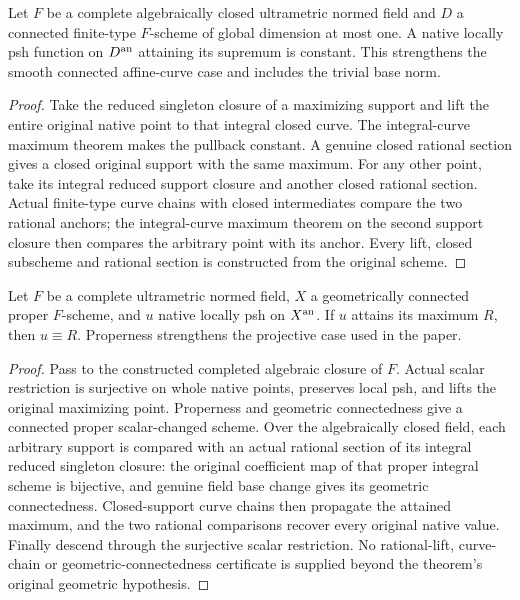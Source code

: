\begin{theorem}\label{thm:fc-curve-mp}
\leanok
{}
Let $F$ be a complete algebraically closed ultrametric normed field and $D$ a connected finite-type $F$-scheme of global dimension at most one. A native locally psh function on $D^{\mathrm{an}}$ attaining its supremum is constant. This strengthens the smooth connected affine-curve case and includes the trivial base norm.
\end{theorem}

\begin{proof}
Take the reduced singleton closure of a maximizing support and lift the entire original native point to that integral closed curve. The integral-curve maximum theorem makes the pullback constant. A genuine closed rational section gives a closed original support with the same maximum. For any other point, take its integral reduced support closure and another closed rational section. Actual finite-type curve chains with closed intermediates compare the two rational anchors; the integral-curve maximum theorem on the second support closure then compares the arbitrary point with its anchor. Every lift, closed subscheme and rational section is constructed from the original scheme.
\end{proof}

\begin{theorem}\label{thm:fc-global-mp}
\leanok
{}
Let $F$ be a complete ultrametric normed field, $X$ a geometrically connected proper $F$-scheme, and $u$ native locally psh on $X^{\mathrm{an}}$. If $u$ attains its maximum $R$, then $u\equiv R$. Properness strengthens the projective case used in the paper.
\end{theorem}

\begin{proof}
Pass to the constructed completed algebraic closure of $F$. Actual scalar restriction is surjective on whole native points, preserves local psh, and lifts the original maximizing point. Properness and geometric connectedness give a connected proper scalar-changed scheme. Over the algebraically closed field, each arbitrary support is compared with an actual rational section of its integral reduced singleton closure: the original coefficient map of that proper integral scheme is bijective, and genuine field base change gives its geometric connectedness. Closed-support curve chains then propagate the attained maximum, and the two rational comparisons recover every original native value. Finally descend through the surjective scalar restriction. No rational-lift, curve-chain or geometric-connectedness certificate is supplied beyond the theorem's original geometric hypothesis.
\end{proof}

